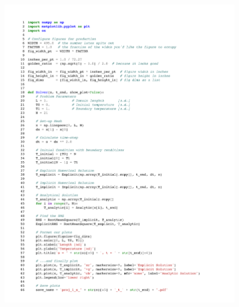 \documentclass[twocolumn,10pt]{asme2ej}
\begin{document}
\begin{figure}[htb]
\begin{center}
\includegraphics[page=3,width=0.93\textwidth]{../Karasinski - Case Study 1.pdf}
\end{center}
\end{figure}
\end{document}
